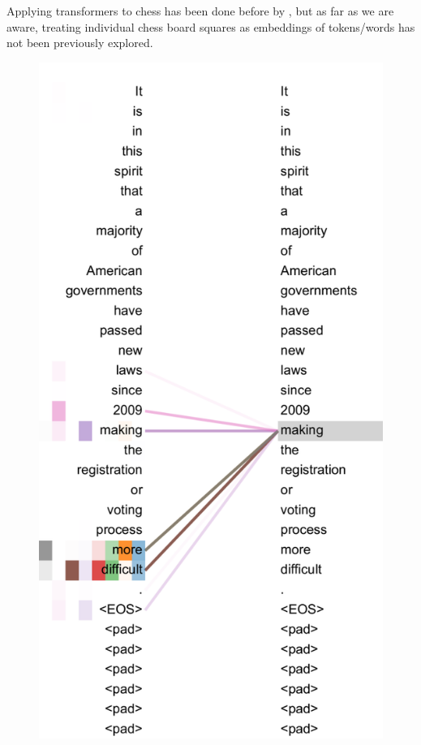 Applying transformers to chess has been done before by
\citet{chessTransformer}, but as far as we are aware, treating individual chess
board squares as embeddings of tokens/words has not been previously explored.

\begin{figure}[H]
  \begin{minipage}{0.425\textwidth}
    \centering
    \includegraphics[width=\textwidth]{project/img/attention.png}

\end{minipage}
\end{figure}

